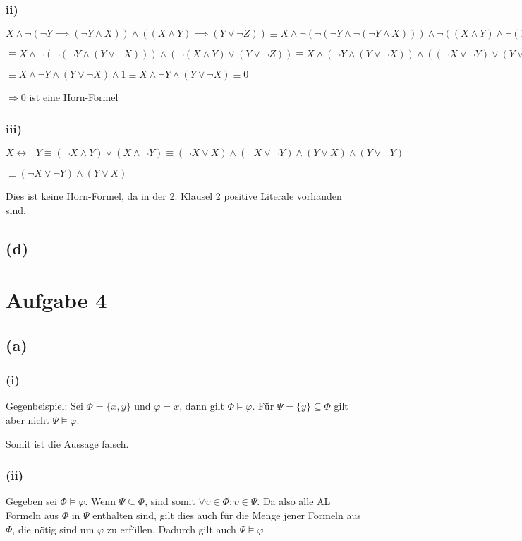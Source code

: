 \documentclass[11pt, a4paper]{article}
\renewcommand{\v}{\vee}
\newcommand{\n}{\wedge}
\begin{document}
\subsubsection*{ii)}
$X \n \neg (\neg Y \implies (\neg Y \n X)) \n ((X \n Y) \implies (Y \v \neg Z)) \equiv X \n \neg (\neg (\neg Y \n \neg (\neg Y \n X))) \n \neg ((X \n Y) \n \neg (Y \v \neg Z))$

$\equiv X \n \neg (\neg (\neg Y \n (Y \v \neg X))) \n ( \neg (X \n Y) \v (Y \v \neg Z)) \equiv X \n (\neg Y \n (Y \v \neg X)) \n ((\neg X \v \neg Y) \v (Y \v \neg Z))$

$\equiv X \n \neg Y \n (Y \v \neg X) \n 1 \equiv X \n \neg Y \n (Y \v \neg X) \equiv 0$

$\Rightarrow 0$ ist eine Horn-Formel

\subsubsection*{iii)}
$X \leftrightarrow \neg Y \equiv (\neg X \n Y) \v (X \n \neg Y) \equiv (\neg X \v X) \n (\neg X \v \neg Y) \n (Y \v X) \n (Y \v \neg Y)$

$\equiv (\neg X \v \neg Y) \n (Y \v X)$

Dies ist keine Horn-Formel, da in der 2. Klausel 2 positive Literale vorhanden sind.

\subsection*{(d)}


\section*{Aufgabe 4}
\subsection*{(a)}
\subsubsection*{(i)}
Gegenbeispiel:
Sei $\Phi = \{ x, y \}$ und $\varphi = x$, dann gilt $\Phi \models \varphi$.
Für $\Psi = \{ y \} \subseteq \Phi$ gilt aber nicht $\Psi \models \varphi$.

Somit ist die Aussage falsch.

\subsubsection*{(ii)}
Gegeben sei $\Phi \models \varphi$.
Wenn $\Psi \subseteq \Phi$, sind somit
$\forall \upsilon \in \Phi: \upsilon \in \Psi$.
Da also alle AL Formeln aus $\Phi$ in $\Psi$ enthalten sind, gilt dies auch für die Menge jener Formeln aus $\Phi$, die nötig sind um $\varphi$ zu erfüllen.
Dadurch gilt auch $\Psi \models \varphi$.
\end{document}
